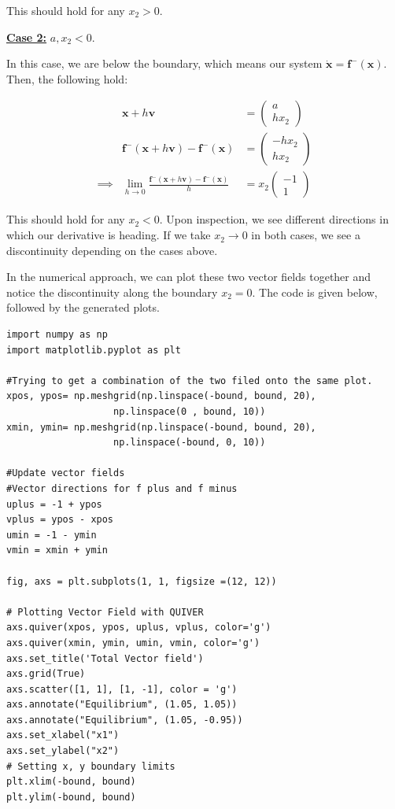 \begin{solution}
This should hold for any $x_2 > 0$.

\newpage
\jump
\underline{\textbf{Case 2:}} $a, x_2 < 0$.
\jump

In this case, we are below the boundary, which means our system $\dot{\textbf{x}} = \textbf{f}^-(\textbf{x})$. Then, the following hold:

\alignbreak
\begin{align}
    &\textbf{x} + h\textbf{v} &= \begin{pmatrix} a\\hx_2\end{pmatrix}\nonumber\\
    &\textbf{f}^-(\textbf{x} + h\textbf{v}) - \textbf{f}^-(\textbf{x}) &= \begin{pmatrix} -hx_2\\ hx_2\end{pmatrix}\nonumber\\
    \implies &\lim_{h \rightarrow 0} \frac{\textbf{f}^-(\textbf{x} + h\textbf{v}) - \textbf{f}^-(\textbf{x})}{h} &= x_2\begin{pmatrix}-1\\1\end{pmatrix}\nonumber
\end{align}
\alignbreak

This should hold for any $x_2 < 0$. Upon inspection, we see different directions in which our derivative is heading. If we take $x_2 \rightarrow 0$ in both cases, we see a discontinuity depending on the cases above.

\jump
In the numerical approach, we can plot these two vector fields together and notice the discontinuity along the boundary $x_2 = 0$. The code is given below, followed by the generated plots.

\begin{lstlisting}
import numpy as np 
import matplotlib.pyplot as plt 

#Trying to get a combination of the two filed onto the same plot.
xpos, ypos= np.meshgrid(np.linspace(-bound, bound, 20),  
                   np.linspace(0 , bound, 10)) 
xmin, ymin= np.meshgrid(np.linspace(-bound, bound, 20),  
                   np.linspace(-bound, 0, 10)) 

#Update vector fields
#Vector directions for f plus and f minus
uplus = -1 + ypos
vplus = ypos - xpos
umin = -1 - ymin
vmin = xmin + ymin

fig, axs = plt.subplots(1, 1, figsize =(12, 12))

# Plotting Vector Field with QUIVER 
axs.quiver(xpos, ypos, uplus, vplus, color='g') 
axs.quiver(xmin, ymin, umin, vmin, color='g') 
axs.set_title('Total Vector field') 
axs.grid(True)
axs.scatter([1, 1], [1, -1], color = 'g')
axs.annotate("Equilibrium", (1.05, 1.05))
axs.annotate("Equilibrium", (1.05, -0.95))
axs.set_xlabel("x1")
axs.set_ylabel("x2")
# Setting x, y boundary limits 
plt.xlim(-bound, bound) 
plt.ylim(-bound, bound) 
  

\end{lstlisting}
\end{solution}
